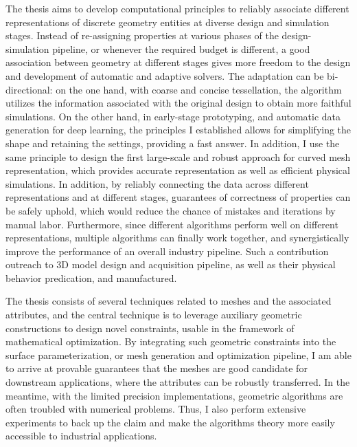 The thesis aims to develop computational principles to reliably associate different representations of discrete geometry entities at diverse design and simulation stages. Instead of re-assigning properties at various phases of the design-simulation pipeline, or whenever the required budget is different, a good association between geometry at different stages gives more freedom to the design and development of automatic and adaptive solvers. The adaptation can be bi-directional: on the one hand, with coarse and concise tessellation, the algorithm utilizes the information associated with the original design to obtain more faithful simulations. On the other hand, in early-stage prototyping, and automatic data generation for deep learning, the principles I established allows for simplifying the shape and retaining the settings, providing a fast answer. In addition, I use the same principle to design the first large-scale and robust approach for curved mesh representation, which provides accurate representation as well as efficient physical simulations.
In addition, by reliably connecting the data across different representations and at different stages, guarantees of correctness of properties can be safely uphold, which would reduce the chance of mistakes and iterations by manual labor. 
Furthermore,  since different algorithms perform well on different representations, multiple algorithms can finally work together, and synergistically improve the performance of an overall industry pipeline.
Such a contribution outreach to 3D model design and acquisition pipeline, as well as their physical behavior predication, and manufactured.

The thesis consists of several techniques related to meshes and the associated attributes, and the central technique is to leverage auxiliary geometric constructions to design novel constraints, usable in the framework of mathematical optimization. 
By integrating such geometric constraints into the surface parameterization, or mesh generation and optimization pipeline, I am able to arrive at provable guarantees that the meshes are good candidate for downstream applications, where the attributes can be robustly transferred.
In the meantime, with the limited precision implementations, geometric algorithms are often troubled with numerical problems. Thus, I also perform extensive experiments to back up the claim and make the algorithms theory more easily accessible to industrial applications.

